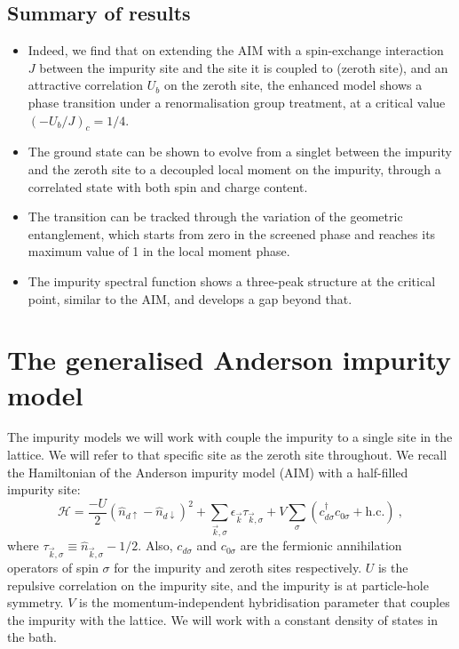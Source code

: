 \documentclass[reprint,superscriptaddress,floatfix]{revtex4-2}
\begin{document}
\subsection*{Summary of results}

\begin{itemize}
	\item {\color{blue}Indeed}, we find that on extending the AIM with a spin-exchange interaction \(J\) between the impurity site and the site it is coupled to (zeroth site), and an attractive correlation \(U_b\) on the zeroth site, the enhanced model shows a phase transition under a renormalisation group treatment, at a critical value \(\left(-U_b/J\right)_c=1/4\). 
	\item The ground state can be shown to evolve from a singlet between the impurity and the zeroth site to a decoupled local moment on the impurity, through a correlated state with both spin and charge content.
	\item The transition can be tracked through the variation of the geometric entanglement, which starts from zero in the screened phase and reaches its maximum value of 1 in the local moment phase.
	\item The impurity spectral function shows a three-peak structure at the critical point, similar to the AIM, and develops a gap beyond that.
\end{itemize}
 

\section{The generalised Anderson impurity model}
\label{def-ham}

The impurity models we will work with couple the impurity to a single site in the lattice. We will refer to that specific site as the zeroth site throughout. We recall the Hamiltonian of the Anderson impurity model (AIM) with a half-filled impurity site:
\begin{equation} 
	\mathcal{H} = \frac{- U}{2} \left(\hat n_{d \uparrow} - \hat n_{d \downarrow}\right)^2 + \sum_{\vec k,\sigma} \epsilon_{\vec k} \tau_{\vec k,\sigma} + V\sum_\sigma \left( c^\dagger_{d\sigma}c_{0\sigma} + \text{h.c.}\right)~,
 \end{equation}
where \(\tau_{\vec k,\sigma} \equiv \hat n_{\vec k,\sigma} - 1/2\). Also, \(c_{d\sigma}\) and \(c_{0\sigma}\) are the fermionic annihilation operators of spin \(\sigma\) for the impurity and zeroth sites respectively. \(U\) is the repulsive correlation on the impurity site, and the impurity is at particle-hole symmetry. \(V\) is the momentum-independent hybridisation parameter that couples the impurity with the lattice. We will work with a constant density of states in the bath. 
\end{document}
